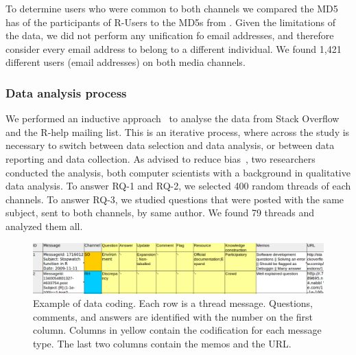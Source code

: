 To determine users who were common to both channels we compared the MD5 has of the participants of R-Users to the MD5s from \SO. Given the limitations of the
\SO data, we did not perform any unification fo email addresses, and therefore consider every email address to belong to a different individual. 
We found 1,421 different users (email addresses) on both media channels.




\subsubsection{Data analysis process}
\label{sec:dap}

    We performed an inductive approach~\cite{Runeson2012} to analyse the data from Stack Overflow and the R-help mailing list. 
    This is an iterative process, where across the study is necessary to switch between data selection and data analysis, or between data reporting and data collection.
    As advised to reduce bias~\cite{Runeson2012}, two researchers conducted the analysis, both computer scientists with a background in qualitative data analysis.
To answer RQ-1 and RQ-2, we selected 400 random threads of each channels.
To answer RQ-3, we studied questions that were posted with the same subject, sent to both channels, by same author. We found 79 threads and analyzed them all.
    
    \begin{figure}[htbp]
    	\centering
    	\includegraphics[width=.95\textwidth]{Figures/CodingExample}
    	\caption{Example of data coding. Each row is a thread message. Questions, comments, and answers are identified with the number on the first column. Columns in yellow contain the codification for each message type. The last two columns contain the memos and the URL.}
    	\label{fig:CodingExample}
    \end{figure}


